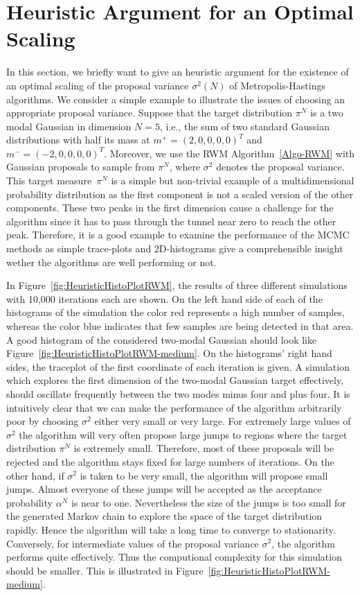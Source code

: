 \section{Heuristic Argument for an Optimal Scaling}
\label{CC:Heuristics}

In this section, we briefly want to give an heuristic argument for the existence of an optimal scaling of the proposal variance $ \sigma^2 (N) $ of Metropolis-Hastings algorithms.
We consider a simple example to illustrate the issues of choosing an appropriate proposal variance. Suppose that the target distribution $ \pi^{N} $ is a two modal Gaussian in dimension $N=5$, i.e., the sum of two standard Gaussian distributions with half its mass at $ m^+ = (2,0,0,0,0)^T $ and  $ m^- = (-2,0,0,0,0)^T $. Moreover, we use the RWM Algorithm~\ref{Algo-RWM} with Gaussian proposals to sample from $ \pi^{N} $, where $ \sigma^2 $ denotes the proposal variance. This target measure~$\pi^N$ is a simple but non-trivial example of a multidimensional probability distribution as the first component is not a scaled version of the other components. These two peaks in the first dimension cause a challenge for the algorithm since it has to pass through the tunnel near zero to reach the other peak. Therefore, it is a good example to examine the performance of the MCMC methods as simple trace-plots and 2D-histograms give a comprehensible insight wether the algorithms are well performing or not.

In Figure~\ref{fig:HeuristicHistoPlotRWM}, the results of three different simulations with 10,000 iterations each are shown. On the left hand side of each of the histograms of the simulation the color red represents a high number of samples, whereas the color blue indicates that few samples are being detected in that area.  A good histogram of the considered two-modal Gaussian should look like Figure~\ref{fig:HeuristicHistoPlotRWM-medium}. On the histograms' right hand sides, the traceplot of the first coordinate of each iteration is given. A simulation which explores the first dimension of the two-modal Gaussian target effectively, should oscillate frequently between the two modes minus four and plus four. It is intuitively clear that we can make the performance of the algorithm arbitrarily poor by choosing $ \sigma^2 $ either very small or very large. For extremely large values of $ \sigma^2 $ the algorithm will very often propose large jumps to regions where the target distribution $ \pi^{N} $ is extremely small. Therefore, most of these proposals will be rejected and the algorithm stays fixed for large numbers of iterations. On the other hand, if $\sigma^2$ is taken to be very small, the algorithm will propose small jumps. Almost everyone of these jumps will be accepted as the acceptance probability $ \alpha^{N} $ is near to one. Nevertheless the size of the jumps is too small for the generated Markov chain to explore the space of the target distribution rapidly. Hence the algorithm will take a long time to converge to stationarity. Conversely, for intermediate values of the proposal variance $\sigma^2$, the algorithm performs quite effectively. Thus the computional complexity for this simulation should be smaller. This is illustrated in Figure~\ref{fig:HeuristicHistoPlotRWM-medium}.

